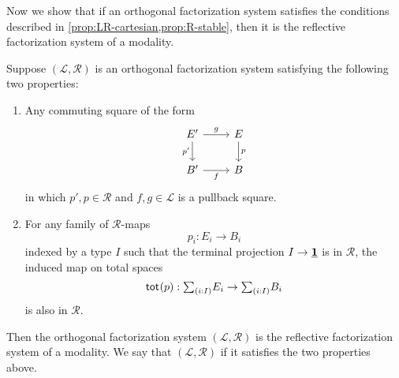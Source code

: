 \documentclass[9pt,twosided]{amsart}
\begin{document}
Now we show that if an orthogonal factorization system satisfies the conditions described in \cref{prop:LR-cartesian,prop:R-stable}, then it is the reflective factorization system of a modality.

\begin{thm}\label{thm:rfs}
  Suppose $(\mathcal{L},\mathcal{R})$ is an orthogonal factorization system satisfying the following two properties:
  \begin{enumerate}
  \item Any commuting square of the form
    \begin{equation*}
      \begin{tikzcd}
        E' \arrow[d,swap,"{p'}"] \arrow[r,"g"] & E \arrow[d,"p"] \\
        B' \arrow[r,swap,"f"] & B
      \end{tikzcd}
    \end{equation*}
    in which $p',p\in\mathcal{R}$ and $f,g\in\mathcal{L}$ is a pullback square.
  \item For any family of $\mathcal{R}$-maps
    \begin{equation*}
      p_i:E_i\to B_i
    \end{equation*}
    indexed by a type $I$ such that the terminal projection $I\to\underline{\mathbf{1}}$ is in $\mathcal{R}$, the induced map on total spaces
    \begin{equation*}
      \total{p}:\sm{i:I}E_i\to\sm{i:I}B_i
    \end{equation*}
    is also in $\mathcal{R}$. 
  \end{enumerate}
  Then the orthogonal factorization system $(\mathcal{L},\mathcal{R})$ is the reflective factorization system of a modality. We say that $(\mathcal{L},\mathcal{R})$  if it satisfies the two properties above.
\end{thm}
\end{document}
